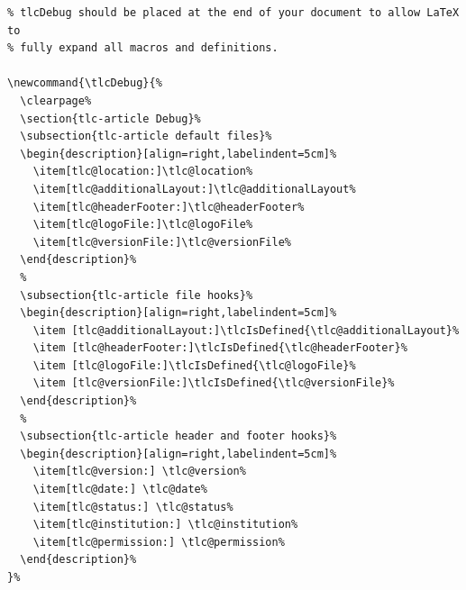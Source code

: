 \documentclass[12pt]{tlc-article}
\begin{document}
\begin{lstlisting}[basicstyle=\ttfamily\tiny]
% We define tlcDebug to aid our users when they are debugging their document.
% tlcDebug should be placed at the end of your document to allow LaTeX to
% fully expand all macros and definitions.

\newcommand{\tlcDebug}{%
  \clearpage%
  \section{tlc-article Debug}%
  \subsection{tlc-article default files}%
  \begin{description}[align=right,labelindent=5cm]%
    \item[tlc@location:]\tlc@location%
    \item[tlc@additionalLayout:]\tlc@additionalLayout%
    \item[tlc@headerFooter:]\tlc@headerFooter%
    \item[tlc@logoFile:]\tlc@logoFile%
    \item[tlc@versionFile:]\tlc@versionFile%
  \end{description}%
  %
  \subsection{tlc-article file hooks}%
  \begin{description}[align=right,labelindent=5cm]%
    \item [tlc@additionalLayout:]\tlcIsDefined{\tlc@additionalLayout}%
    \item [tlc@headerFooter:]\tlcIsDefined{\tlc@headerFooter}%
    \item [tlc@logoFile:]\tlcIsDefined{\tlc@logoFile}%
    \item [tlc@versionFile:]\tlcIsDefined{\tlc@versionFile}%
  \end{description}%
  %
  \subsection{tlc-article header and footer hooks}%
  \begin{description}[align=right,labelindent=5cm]%
    \item[tlc@version:] \tlc@version%
    \item[tlc@date:] \tlc@date%
    \item[tlc@status:] \tlc@status%
    \item[tlc@institution:] \tlc@institution%
    \item[tlc@permission:] \tlc@permission%
  \end{description}%
}%
\end{lstlisting}
\end{document}
